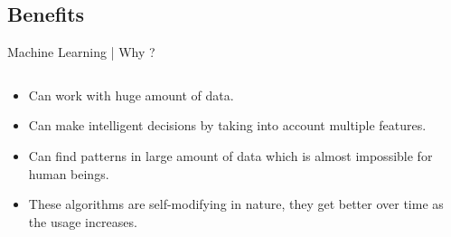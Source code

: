 \documentclass[10pt]{beamer}
\begin{document}
		\subsection{Benefits}
			\begin{frame}{Machine Learning | Why ?}
				\begin{columns}
					\begin{column}{0.5\textwidth}
						\begin{itemize}
							\item Can work with huge amount of data.
							\item Can make intelligent decisions by taking into account multiple features.
							\item Can find patterns in large amount of data which is almost impossible for human beings. 
							\item These algorithms are self-modifying in nature, they get better over time as the usage increases.
						\end{itemize}
					\end{column}
					\begin{column}{0.5\textwidth}
						\begin{center}

\end{center}
\end{column}
\end{columns}
\end{frame}
\end{document}
